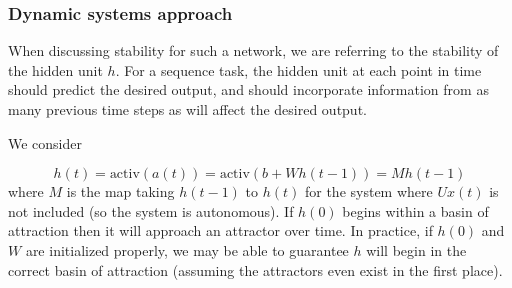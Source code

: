 \documentclass{beamer}
\begin{document}
\begin{frame}
  \frametitle{Dynamic systems approach}
  When discussing stability for such a network, we are referring to the stability of the hidden unit $h$. For a sequence task, the hidden unit at each point in time should predict the desired output, and should incorporate information from as many previous time steps as will affect the desired output.

    \vspace{0.5cm}

  We consider

\begin{equation*}
h(t) = \mbox{activ}(a(t)) = \mbox{activ}(b + W h(t-1)) = M h(t-1)
\end{equation*}
%
where $M$ is the map taking $h(t - 1)$ to $h(t)$ for the system where $Ux(t)$ is not included (so the system is autonomous). If $h(0)$ begins within a basin of attraction then it will approach an attractor over time. In practice, if $h(0)$ and $W$ are initialized properly, we may be able to guarantee $h$ will begin in the correct basin of attraction (assuming the attractors even exist in the first place).

\end{frame}
\end{document}
